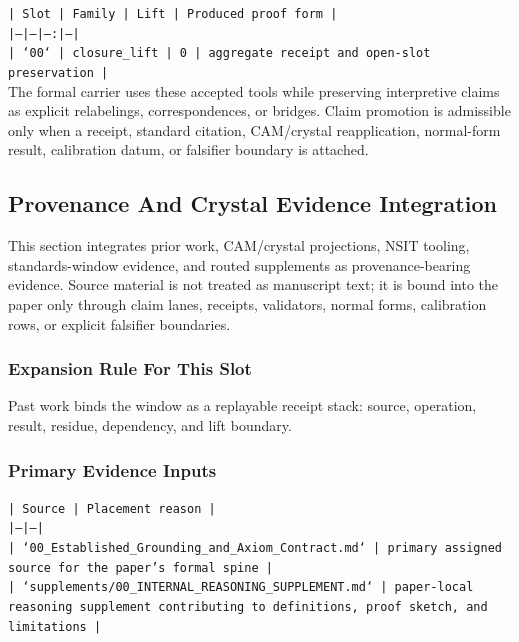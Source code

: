 \documentclass[11pt]{article}
\begin{document}
\noindent\texttt{| Slot | Family | Lift | Produced proof form |}\\
\noindent\texttt{|---|---|---:|---|}\\
\noindent\texttt{| `00` | closure\_lift | 0 | aggregate receipt and open-slot preservation |}\\

The formal carrier uses these accepted tools while preserving interpretive
claims as explicit relabelings, correspondences, or bridges. Claim promotion is admissible only when a receipt, standard citation,
CAM/crystal reapplication, normal-form result, calibration datum, or falsifier
boundary is attached.

\subsection*{Provenance And Crystal Evidence Integration}

This section integrates prior work, CAM/crystal projections, NSIT tooling,
standards-window evidence, and routed supplements as provenance-bearing
evidence. Source material is not treated as manuscript text; it is bound into
the paper only through claim lanes, receipts, validators, normal forms,
calibration rows, or explicit falsifier boundaries.

\subsubsection*{Expansion Rule For This Slot}

Past work binds the window as a replayable receipt stack: source, operation, result, residue, dependency, and lift boundary.

\subsubsection*{Primary Evidence Inputs}

\noindent\texttt{| Source | Placement reason |}\\
\noindent\texttt{|---|---|}\\
\noindent\texttt{| `00\_Established\_Grounding\_and\_Axiom\_Contract.md` | primary assigned source for the paper's formal spine |}\\
\noindent\texttt{| `supplements/00\_INTERNAL\_REASONING\_SUPPLEMENT.md` | paper-local reasoning supplement contributing to definitions, proof sketch, and limitations |}\\
\end{document}
